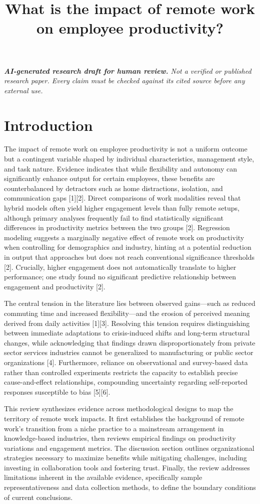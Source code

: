 \documentclass[conference]{IEEEtran}
\title{What is the impact of remote work on employee productivity?}
\author{\IEEEauthorblockN{ResearchGenie}\IEEEauthorblockA{AI-generated research draft}}
\begin{document}
\maketitle
\textit{\textbf{AI-generated research draft for human review.} Not a verified or published research paper. Every claim must be checked against its cited source before any external use.}\par

\section{Introduction}
The impact of remote work on employee productivity is not a uniform outcome but a contingent variable shaped by individual characteristics, management style, and task nature. Evidence indicates that while flexibility and autonomy can significantly enhance output for certain employees, these benefits are counterbalanced by detractors such as home distractions, isolation, and communication gaps [1][2]. Direct comparisons of work modalities reveal that hybrid models often yield higher engagement levels than fully remote setups, although primary analyses frequently fail to find statistically significant differences in productivity metrics between the two groups [2]. Regression modeling suggests a marginally negative effect of remote work on productivity when controlling for demographics and industry, hinting at a potential reduction in output that approaches but does not reach conventional significance thresholds [2]. Crucially, higher engagement does not automatically translate to higher performance; one study found no significant predictive relationship between engagement and productivity [2].

The central tension in the literature lies between observed gains—such as reduced commuting time and increased flexibility—and the erosion of perceived meaning derived from daily activities [1][3]. Resolving this tension requires distinguishing between immediate adaptations to crisis-induced shifts and long-term structural changes, while acknowledging that findings drawn disproportionately from private sector services industries cannot be generalized to manufacturing or public sector organizations [4]. Furthermore, reliance on observational and survey-based data rather than controlled experiments restricts the capacity to establish precise cause-and-effect relationships, compounding uncertainty regarding self-reported responses susceptible to bias [5][6].

This review synthesizes evidence across methodological designs to map the territory of remote work impacts. It first establishes the background of remote work's transition from a niche practice to a mainstream arrangement in knowledge-based industries, then reviews empirical findings on productivity variations and engagement metrics. The discussion section outlines organizational strategies necessary to maximize benefits while mitigating challenges, including investing in collaboration tools and fostering trust. Finally, the review addresses limitations inherent in the available evidence, specifically sample representativeness and data collection methods, to define the boundary conditions of current conclusions.
\end{document}
